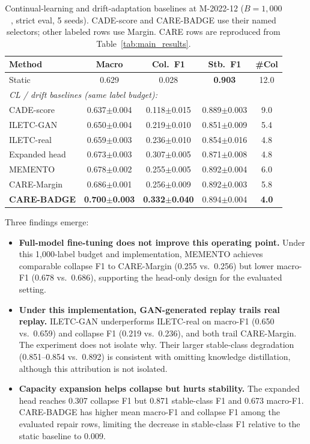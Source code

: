 \documentclass[journal]{IEEEtran}
\newcommand{\ours}{CARE}  %
\begin{document}
\begin{table}[!htbp]
\centering
\caption{Continual-learning and drift-adaptation baselines at M-2022-12 ($B{=}1{,}000$, strict eval, 5 seeds). CADE-score and CARE-BADGE use their named selectors; other labeled rows use Margin. CARE rows are reproduced from Table~\ref{tab:main_results}.}
\label{tab:cl_baselines}
\scriptsize
\setlength{\tabcolsep}{3pt}
\begin{tabular}{@{}l cccc@{}}
\toprule
Method & Macro & Col.\ F1 & Stb.\ F1 & \#Col \\
\midrule
Static & 0.629 & 0.028 & \textbf{0.903} & 12.0 \\
\midrule
\multicolumn{5}{l}{\textit{CL / drift baselines (same label budget):}} \\
CADE-score~\cite{yang2021cade}     & 0.637$\pm$0.004 & 0.118$\pm$0.015 & 0.889$\pm$0.003 & 9.0 \\
ILETC-GAN~\cite{zhu2023iletc}     & 0.650$\pm$0.004 & 0.219$\pm$0.010 & 0.851$\pm$0.009 & 5.4 \\
ILETC-real                         & 0.659$\pm$0.003 & 0.236$\pm$0.010 & 0.854$\pm$0.016 & 4.8 \\
Expanded head                      & 0.673$\pm$0.003 & 0.307$\pm$0.005 & 0.871$\pm$0.008 & 4.8 \\
MEMENTO~\cite{cerasuolo2024memento}& 0.678$\pm$0.002 & 0.255$\pm$0.005 & 0.892$\pm$0.004 & 6.0 \\
\midrule
\ours{}-Margin & 0.686$\pm$0.001 & 0.256$\pm$0.009 & 0.892$\pm$0.003 & 5.8 \\
\textbf{\ours{}-BADGE} & \textbf{0.700$\pm$0.003} & \textbf{0.332$\pm$0.040} & 0.894$\pm$0.004 & \textbf{4.0} \\
\bottomrule
\end{tabular}
\end{table}

Three findings emerge:
\begin{itemize}
  \item \textbf{Full-model fine-tuning does not improve this operating point.} Under this 1{,}000-label budget and implementation, MEMENTO achieves comparable collapse F1 to \ours{}-Margin (0.255 vs.\ 0.256) but lower macro-F1 (0.678 vs.\ 0.686), supporting the head-only design for the evaluated setting.
  \item \textbf{Under this implementation, GAN-generated replay trails real replay.} ILETC-GAN underperforms ILETC-real on macro-F1 (0.650 vs.\ 0.659) and collapse F1 (0.219 vs.\ 0.236), and both trail \ours{}-Margin. The experiment does not isolate why. Their larger stable-class degradation (0.851--0.854 vs.\ 0.892) is consistent with omitting knowledge distillation, although this attribution is not isolated.
  \item \textbf{Capacity expansion helps collapse but hurts stability.} The expanded head reaches 0.307 collapse F1 but 0.871 stable-class F1 and 0.673 macro-F1. \ours{}-BADGE has higher mean macro-F1 and collapse F1 among the evaluated repair rows, limiting the decrease in stable-class F1 relative to the static baseline to 0.009.
\end{itemize}
\end{document}
